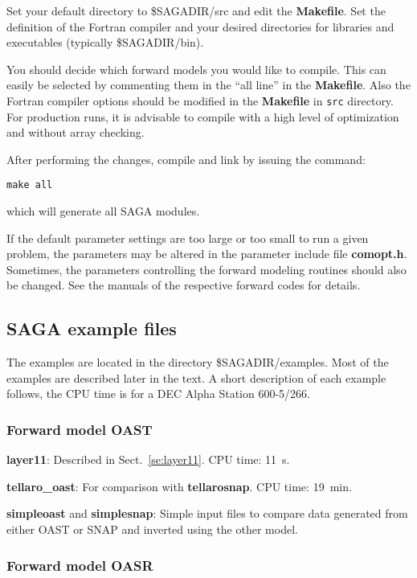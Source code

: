 \documentclass{saclantc}
\begin{document}
Set your default directory to \$SAGADIR/src and edit the {\bf
Makefile}. Set the definition of the Fortran compiler and your desired
directories for libraries and executables (typically \$SAGADIR/bin).

You should decide which forward models you would like to compile. This can
easily be selected by commenting them  in the ``all line'' in the {\bf
Makefile}.
Also the Fortran compiler options should be modified in the {\bf
Makefile} in {\tt src} directory. For production runs, it is
advisable to compile with a high level of optimization and without
array checking.

\noindent    After  performing  the changes, compile and link  by issuing the 
command:

    {\tt make all}

\noindent which will generate all {\sf SAGA} modules.

    If  the default parameter settings are too large or too small to run
a given problem, the parameters  may 
be  altered in the parameter include file {\bf comopt.h}. Sometimes,
the parameters
controlling the forward modeling routines should also be
changed. See the 
manuals of the respective forward codes for details. 


\subsection{SAGA example files}

\vspace*{-1.0mm}
The examples are located in the directory
\$SAGADIR/examples. Most of the examples are described later in the text.
A short description of each example follows, the CPU time is for  a
DEC Alpha Station 600-5/266.

\subsubsection{Forward model OAST}

\vspace*{-1.0mm}\noindent
{\bf layer11}: Described in Sect.~\ref{se:layer11}. CPU time: 11~s.

{\bf tellaro\_oast}: For comparison with {\bf tellarosnap}. CPU time: 19~min.
\noindent

{\bf simpleoast} and {\bf simplesnap}: Simple input files to compare
data generated from either {\sf OAST} or {\sf SNAP} and inverted using the 
other model. 
\subsubsection{Forward model OASR}
\end{document}
